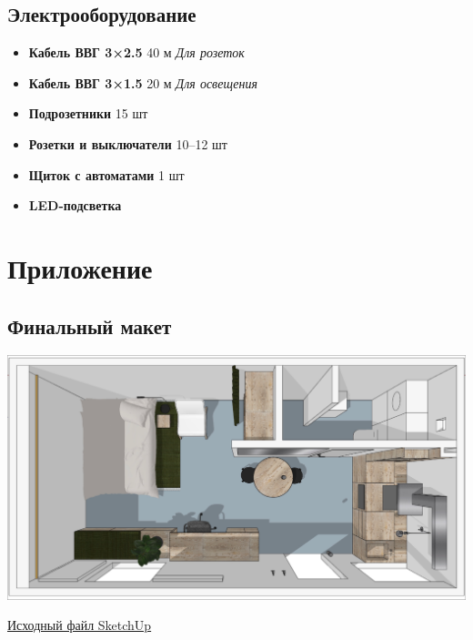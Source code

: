 \documentclass[11pt]{article}
\begin{document}
\subsection{Электрооборудование}
\label{sec:org6b50129}

\begin{itemize}
\item \textbf{Кабель ВВГ 3×2.5} 40 м \emph{Для розеток}
\item \textbf{Кабель ВВГ 3×1.5} 20 м \emph{Для освещения}
\item \textbf{Подрозетники} 15 шт
\item \textbf{Розетки и выключатели} 10–12 шт
\item \textbf{Щиток с автоматами} 1 шт
\item \textbf{LED-подсветка}
\end{itemize}
\section{Приложение}
\label{sec:orgb92195b}

\subsection{Финальный макет}
\label{sec:org2584c6a}
\begin{center}
\includegraphics[width=.9\linewidth]{Приложение/2025-03-19_12-29-29_screenshot.png}
\end{center}

\href{https://drive.google.com/file/d/13h-R1aoj9f6Z40jsrrGZrNA3UMwl2f0N/view?usp=sharing}{Исходный файл SketchUp}
\end{document}
